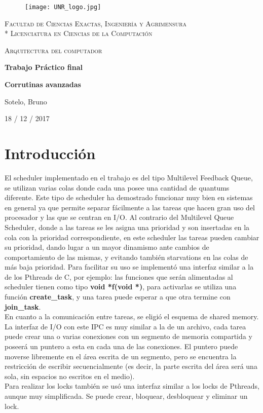 \documentclass[a4paper]{article}
\begin{document}
\begin{titlepage}
\centering
\begin{figure}[H]
    \begin{center}
        \texttt{[image: UNR\_logo.jpg]}
    \end{center}
\end{figure}
{\scshape\large Facultad de Ciencias Exactas, Ingenier\'ia y Agrimensura\\*
                 Licenciatura en Ciencias de la Computaci\'on\par}
\vspace{5cm}
{\scshape\LARGE Arquitectura del computador \par}
{\huge\bfseries Trabajo Pr\'actico final \par}
{\huge\bfseries Corrutinas avanzadas \par}
\vspace{3cm}
{\Large Sotelo, Bruno\par}
\vfill
{\large 18  / 12 / 2017 \par}
\end{titlepage}



\section{Introducción}
El scheduler implementado en el trabajo es del tipo Multilevel Feedback 
Queue, se utilizan varias colas donde cada una posee una cantidad de
quantums diferente. Este tipo de scheduler ha demostrado funcionar muy
bien en sistemas en general ya que permite separar fácilmente a las
tareas que hacen gran uso del procesador y las que se centran en I/O. Al
contrario del Multilevel Queue Scheduler, donde a las tareas se les
asigna una prioridad y son insertadas en la cola con la prioridad 
correspondiente, en este scheduler las tareas pueden cambiar su prioridad,
dando lugar a un mayor dinamismo ante cambios de comportamiento de las
mismas, y evitando también starvations en las colas de más baja prioridad.
Para facilitar su uso se implementó una interfaz similar a la de los
Pthreads de C, por ejemplo: las funciones que serán alimentadas al scheduler
tienen como tipo \textbf{void *f(void *)}, para activarlas se utiliza una
función \textbf{create\_task}, y una tarea puede esperar a que otra termine
con \textbf{join\_task}. \\
En cuanto a la comunicación entre tareas, se eligió el esquema de shared
memory. La interfaz de I/O con este IPC es muy similar a la de un archivo,
cada tarea puede crear una o varias conexiones con un segmento de memoria
compartida y poseerá un puntero a esta en cada una de las conexiones. El
puntero puede moverse libremente en el área escrita de un segmento, pero
se encuentra la restricción de escribir secuencialmente (es decir, la 
parte escrita del área será una sola, sin espacios no escritos en el
medio). \\
Para realizar los locks también se usó una interfaz similar a los locks
de Pthreads, aunque muy simplificada. Se puede crear, bloquear, desbloquear
y eliminar un lock.
\end{document}
